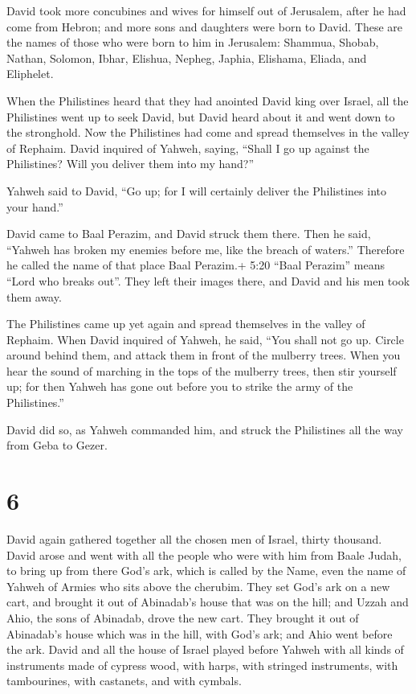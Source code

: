  David took more concubines and wives for himself out of
Jerusalem, after he had come from Hebron; and more sons and daughters
were born to David.  These are the names of those who were
born to him in Jerusalem: Shammua, Shobab, Nathan, Solomon,
 Ibhar, Elishua, Nepheg, Japhia,  Elishama,
Eliada, and Eliphelet.

 When the Philistines heard that they had anointed David
king over Israel, all the Philistines went up to seek David, but David
heard about it and went down to the stronghold.  Now the
Philistines had come and spread themselves in the valley of Rephaim.
 David inquired of Yahweh, saying, ``Shall I go up against
the Philistines? Will you deliver them into my hand?''

Yahweh said to David, ``Go up; for I will certainly deliver the
Philistines into your hand.''

 David came to Baal Perazim, and David struck them there.
Then he said, ``Yahweh has broken my enemies before me, like the breach
of waters.'' Therefore he called the name of that place Baal Perazim.+
5:20 ``Baal Perazim'' means ``Lord who breaks out''.  They
left their images there, and David and his men took them away.

 The Philistines came up yet again and spread themselves in
the valley of Rephaim.  When David inquired of Yahweh, he
said, ``You shall not go up. Circle around behind them, and attack them
in front of the mulberry trees.  When you hear the sound of
marching in the tops of the mulberry trees, then stir yourself up; for
then Yahweh has gone out before you to strike the army of the
Philistines.''

 David did so, as Yahweh commanded him, and struck the
Philistines all the way from Geba to Gezer.

\hypertarget{section-5}{%
\section{6}\label{section-5}}

 David again gathered together all the chosen men of Israel,
thirty thousand.  David arose and went with all the people
who were with him from Baale Judah, to bring up from there God's ark,
which is called by the Name, even the name of Yahweh of Armies who sits
above the cherubim.  They set God's ark on a new cart, and
brought it out of Abinadab's house that was on the hill; and Uzzah and
Ahio, the sons of Abinadab, drove the new cart.  They
brought it out of Abinadab's house which was in the hill, with God's
ark; and Ahio went before the ark.  David and all the house
of Israel played before Yahweh with all kinds of instruments made of
cypress wood, with harps, with stringed instruments, with tambourines,
with castanets, and with cymbals.

